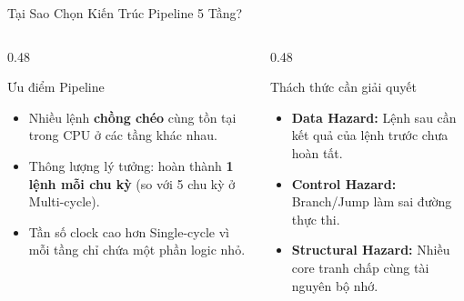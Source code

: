 \begin{frame}{Tại Sao Chọn Kiến Trúc Pipeline 5 Tầng?}
    \vspace{0.1cm}
    \begin{columns}[T]
        \begin{column}{0.48\textwidth}
            \begin{block}{Ưu điểm Pipeline}
                \scriptsize
                \begin{itemize}
                    \item Nhiều lệnh \textbf{chồng chéo} cùng tồn tại trong CPU ở các tầng khác nhau.
                    \item Thông lượng lý tưởng: hoàn thành \textbf{1 lệnh mỗi chu kỳ} (so với 5 chu kỳ ở Multi-cycle).
                    \item Tần số clock cao hơn Single-cycle vì mỗi tầng chỉ chứa một phần logic nhỏ.
                \end{itemize}
            \end{block}
        \end{column}

        \begin{column}{0.48\textwidth}
            \begin{alertblock}{Thách thức cần giải quyết}
                \scriptsize
                \begin{itemize}
                    \item \textbf{Data Hazard:} Lệnh sau cần kết quả của lệnh trước chưa hoàn tất.
                    \item \textbf{Control Hazard:} Branch/Jump làm sai đường thực thi.
                    \item \textbf{Structural Hazard:} Nhiều core tranh chấp cùng tài nguyên bộ nhớ.
                \end{itemize}
            \end{alertblock}
        \end{column}
    \end{columns}
\end{frame}